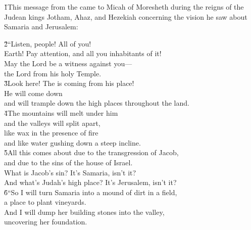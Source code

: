 


\v{1}This message from the  came to Micah of Moresheth during the reigns of the Judean kings Jotham, Ahaz, and Hezekiah concerning the vision he saw about Samaria and Jerusalem:

\begin{poetry}
\poeml \v{2}``Listen, people! All of you! \\
\poemll    Earth! Pay attention, and all you inhabitants of it! \\
\poeml May the Lord  be a witness against you--- \\
\poemll    the Lord from his holy Temple. \\
\poeml \v{3}Look here! The  is coming from his place! \\
\poemll    He will come down \\
\poemlll       and will trample down the high places throughout the land. \\
\poeml \v{4}The mountains will melt under him \\
\poemll    and the valleys will split apart, \\
\poeml like wax in the presence of fire \\
\poemll    and like water gushing down a steep incline. \\
\poeml \v{5}All this comes about due to the transgression of Jacob, \\
\poemll    and due to the sins of the house of Israel. \\
\poeml What is Jacob's sin? It's Samaria, isn't it? \\
\poemll    And what's Judah's high place? It's Jerusalem, isn't it? \\
\poeml \v{6}``So I will turn Samaria into a mound of dirt in a field, \\
\poemll    a place to plant vineyards. \\
\poeml And I will dump her building stones into the valley, \\
\poemll    uncovering her foundation. \\

\end{poetry}
